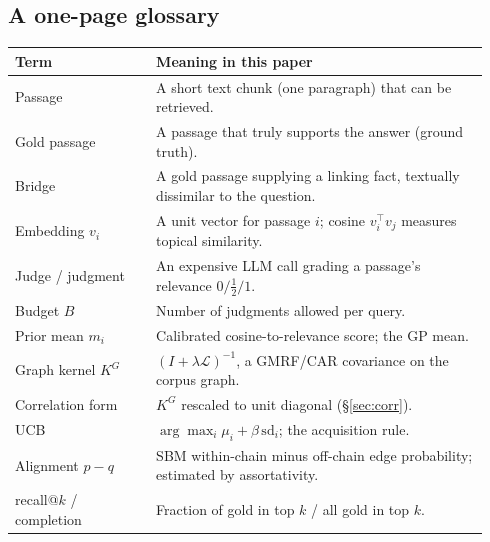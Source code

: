 \documentclass[11pt]{article}
\theoremstyle{plain}
\theoremstyle{definition}
\theoremstyle{remark}
\begin{document}
\subsection*{A one-page glossary}
\noindent\begin{tabular}{@{}p{0.28\linewidth}p{0.66\linewidth}@{}}
\toprule
Term & Meaning in this paper \\ \midrule
Passage & A short text chunk (one paragraph) that can be retrieved. \\
Gold passage & A passage that truly supports the answer (ground truth). \\
Bridge & A gold passage supplying a linking fact, textually dissimilar to the question. \\
Embedding $v_i$ & A unit vector for passage $i$; cosine $v_i^\top v_j$ measures topical similarity. \\
Judge / judgment & An expensive LLM call grading a passage's relevance $0/\tfrac12/1$. \\
Budget $B$ & Number of judgments allowed per query. \\
Prior mean $m_i$ & Calibrated cosine-to-relevance score; the GP mean. \\
Graph kernel $K^G$ & $(I+\lambda\mathcal L)^{-1}$, a GMRF/CAR covariance on the corpus graph. \\
Correlation form & $K^G$ rescaled to unit diagonal (\S\ref{sec:corr}). \\
UCB & $\arg\max_i\mu_i+\beta\,\mathrm{sd}_i$; the acquisition rule. \\
Alignment $p-q$ & SBM within-chain minus off-chain edge probability; estimated by assortativity. \\
recall@$k$ / completion & Fraction of gold in top $k$ / all gold in top $k$. \\
\bottomrule
\end{tabular}



\end{document}
